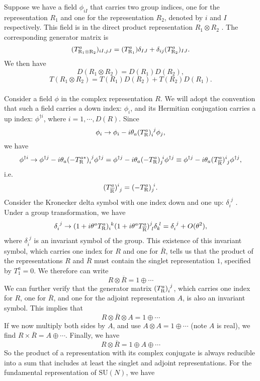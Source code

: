 \noindent
Suppose we have a field $\phi_{iI}$ that carries two group indices, one for the representation $R_1$ and one for the representation $R_2$, denoted by $i$ and $I$ respectively.
This field is in the direct product representation $R_1 \otimes R_2$ . The corresponding generator matrix is
\[(T^a_{\rm R_1 \otimes R_2})_{iI,jJ} = (T^a_{\rm R_1})\delta_{IJ} + \delta_{ij}(T^a_{\rm R_2})_{IJ}.\]
We then have
\[D(R_1\otimes R_2) = D(R_1)D(R_2),\]
\[T(R_1\otimes R_2) = T(R_1)D(R_2) + T(R_2)D(R_1).\]
\\
Consider a field $\phi$ in the complex representation $R$. We will adopt the convention that such a field carries a
down index: $\phi_i$, and its Hermitian conjugation carries a up index: $\phi^{\dagger i}$, where $i = 1,\cdots,D(R)$.
Since
\[\phi_i \to \phi_i - i\theta_a (T^a_{\rm R})_{i}^{\phantom{i}j}\phi_j ,\]
we have
\[\phi^{\dagger i} \to \phi^{\dagger j} - i\theta_a (-T^{a*}_{\rm R})_{i}^{\phantom{i}j}\phi^{\dagger j} = \phi^{\dagger j} - i\theta_a (-T^{a}_{\rm R})_{j}^{\phantom{i}i}\phi^{\dagger j} \equiv \phi^{\dagger j} - i\theta_a (T^{a}_{\rm \overline{R}})^{i}_{\phantom{i}j}\phi^{\dagger j},\]
i.e.
\[(T^{a}_{\rm \overline{R}})^{i}_{\phantom{i}j} = (-T^{a}_{\rm R})_{j}^{\phantom{i}i}.\]
Consider the Kronecker delta symbol with one index down and one up: $\delta_i^{\phantom{i}j}$ . Under a group transformation, we have
\[\delta_i^{\phantom{i}j} \to (1+i\theta^a T^a_{\rm R})_{i}^{\phantom{i}k} (1+i\theta^a T^a_{\rm \overline{R}})^{j}_{\phantom{i}l}\delta_k^{\phantom{i}l} = \delta_i^{\phantom{i}j} + O(\theta^2),\]
where $\delta_i^{\phantom{i}j}$ is an invariant symbol of the group. This existence of this invariant symbol, which carries one index for $R$ and one for $\overline{R}$, tells us that the product of the representations $R$ and $\overline{R}$ must contain the singlet representation $1$, specified by $T_1^a = 0$. We therefore can write
\[R \otimes \overline{R} = 1 \oplus \cdots\]
We can further verify that the generator matrix $(T_{\rm R}^a)_i^{\phantom{i}j}$, which carries one index for $R$, one for $\overline{R}$, and one for the adjoint representation $A$, is also an invariant symbol.
This implies that
\[R \otimes \overline{R} \otimes A = 1 \oplus \cdots\]
If we now multiply both sides by $A$, and use $A \otimes A = 1 \oplus \cdots$ (note $A$ is real), we find $R \times \overline{R} = A \oplus \cdots$. Finally, we have
\[R \otimes \overline{R} = 1 \oplus A \oplus \cdots\]
So the product of a representation with its complex conjugate is always reducible into a sum that includes at least the singlet and adjoint representations. For the fundamental representation of $\mathrm{SU}(N)$, we have
